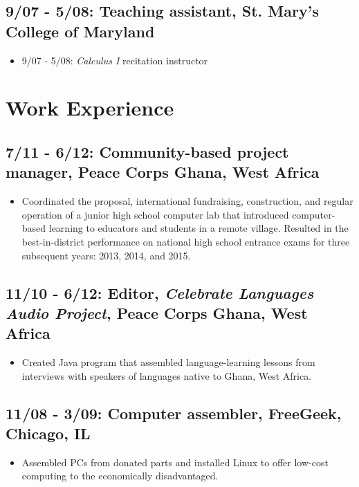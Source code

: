 \documentclass[11pt]{article}
\begin{document}
\subsection*{9/07 - 5/08: Teaching assistant, St. Mary's College of Maryland}
\label{sec:orgheadline15}
\begin{itemize}
\item 9/07 - 5/08: \emph{Calculus I} recitation instructor\\
\end{itemize}
\section*{Work Experience}
\label{sec:orgheadline20}
\subsection*{7/11 - 6/12: Community-based project manager, Peace Corps Ghana, West Africa}
\label{sec:orgheadline17}
\begin{itemize}
\item Coordinated the proposal, international fundraising, construction, and regular operation of a junior high school computer lab that introduced computer-based learning to educators and students in a remote village. Resulted in the best-in-district performance on national high school entrance exams for three subsequent years: 2013, 2014, and 2015.\\
\end{itemize}
\subsection*{11/10 - 6/12: Editor, \emph{Celebrate Languages Audio Project}, Peace Corps Ghana, West Africa}
\label{sec:orgheadline18}
\begin{itemize}
\item Created Java program that assembled language-learning lessons from interviews with speakers of languages native to Ghana, West Africa.\\
\end{itemize}
\subsection*{11/08 - 3/09: Computer assembler, FreeGeek, Chicago, IL}
\label{sec:orgheadline19}
\begin{itemize}
\item Assembled PCs from donated parts and installed Linux to offer low-cost computing to the economically disadvantaged.\\
\end{itemize}
\end{document}

